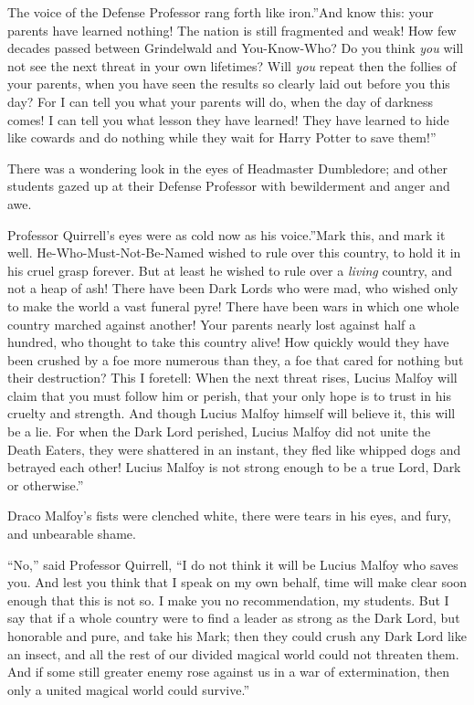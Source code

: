 The voice of the Defense Professor rang forth like iron.''And know this:
your parents have learned nothing! The nation is still fragmented and
weak! How few decades passed between Grindelwald and You-Know-Who? Do
you think \emph{you} will not see the next threat in your own lifetimes?
Will \emph{you} repeat then the follies of your parents, when you have
seen the results so clearly laid out before you this day? For I can tell
you what your parents will do, when the day of darkness comes! I can
tell you what lesson they have learned! They have learned to hide like
cowards and do nothing while they wait for Harry Potter to save them!''

There was a wondering look in the eyes of Headmaster Dumbledore; and
other students gazed up at their Defense Professor with bewilderment and
anger and awe.

Professor Quirrell's eyes were as cold now as his voice.''Mark this, and
mark it well. He-Who-Must-Not-Be-Named wished to rule over this country,
to hold it in his cruel grasp forever. But at least he wished to rule
over a \emph{living} country, and not a heap of ash! There have been
Dark Lords who were mad, who wished only to make the world a vast
funeral pyre! There have been wars in which one whole country marched
against another! Your parents nearly lost against half a hundred, who
thought to take this country alive! How quickly would they have been
crushed by a foe more numerous than they, a foe that cared for nothing
but their destruction? This I foretell: When the next threat rises,
Lucius Malfoy will claim that you must follow him or perish, that your
only hope is to trust in his cruelty and strength. And though Lucius
Malfoy himself will believe it, this will be a lie. For when the Dark
Lord perished, Lucius Malfoy did not unite the Death Eaters, they were
shattered in an instant, they fled like whipped dogs and betrayed each
other! Lucius Malfoy is not strong enough to be a true Lord, Dark or
otherwise.''

Draco Malfoy's fists were clenched white, there were tears in his eyes,
and fury, and unbearable shame.

``No,'' said Professor Quirrell, ``I do not think it will be Lucius
Malfoy who saves you. And lest you think that I speak on my own behalf,
time will make clear soon enough that this is not so. I make you no
recommendation, my students. But I say that if a whole country were to
find a leader as strong as the Dark Lord, but honorable and pure, and
take his Mark; then they could crush any Dark Lord like an insect, and
all the rest of our divided magical world could not threaten them. And
if some still greater enemy rose against us in a war of extermination,
then only a united magical world could survive.''

